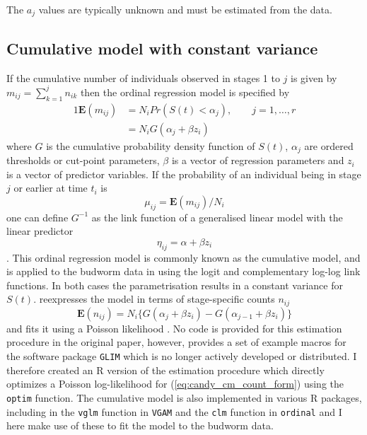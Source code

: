 The $a_j$ values are typically unknown and must be estimated from the data.

\subsection{Cumulative model with constant variance }
If the cumulative number of individuals observed in stages 1 to $j$ is given by $m_{ij}=\sum_{k=1}^jn_{ik}$ then the ordinal regression model \citep{mccullagh1980regression} is specified by %
\begin{alignat}{1}
\mathbf{E}(m_{ij})&=N_iPr(S(t) < \alpha_j), \qquad j = 1,\dots ,r\\
&=N_iG(\alpha_j + \beta z_i)
\end{alignat}
where $G$ is the cumulative probability density function of $S(t)$, $\alpha_j$ are ordered thresholds or cut-point parameters, $\beta$ is a vector of regression parameters and $z_i$ is a vector of predictor variables.
If the probability of an individual being in stage $j$ or earlier at time $t_i$ is $$\mu_{ij} = \mathbf{E}(m_{ij})/N_i$$ one can define $G^{-1}$ as the link function of a generalised linear model with the linear predictor $$\eta_{ij}=\alpha+\beta z_i$$. This ordinal regression model is commonly known as the cumulative model, and is applied to the budworm data in \citep{candy1991modeling} using the logit and complementary log-log link functions. In  both cases the parametrisation results in a constant variance for $S(t)$. \citet{candy1991modeling} reexpresses the model in terms of stage-specific counts $n_{ij}$  
\begin{equation}
\mathbf{E}(n_{ij})=N_i\{G(\alpha_j + \beta z_i) - G(\alpha_{j-1} + \beta z_i)\}
\label{eq:candy_cm_count_form}
\end{equation}
and fits it using a Poisson likelihood \citep{thompson1981composite}. No code is provided for this estimation procedure in the original paper, however, \citep{candy1990biology} provides a set of example macros for the software package \verb+GLIM+ \citep{aitkin1989statistical} which is no longer actively developed or distributed. I therefore created an R version of the estimation procedure which directly optimizes a Poisson log-likelihood for (\ref{eq:candy_cm_count_form}) using the \verb+optim+ function. The cumulative model is also implemented in various R packages, including in the \verb+vglm+ function in \verb+VGAM+ \citep{VGAM} and the \verb+clm+ function in \verb+ordinal+ \cite{ordinal} and I here make use of these to fit the model to the budworm data.

